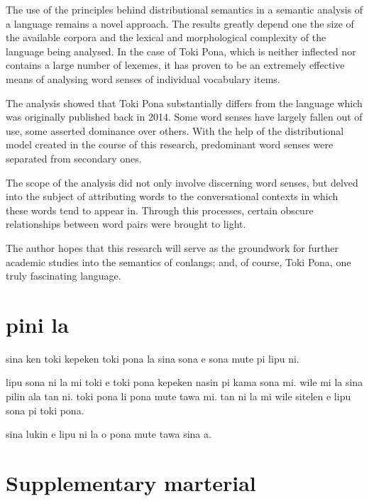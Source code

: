 \documentclass[14pt, a4paper]{extreport}
\begin{document}
The use of the principles behind distributional semantics in a semantic analysis of a language remains a novel approach. The results greatly depend one the size of the available corpora and the lexical and morphological complexity of the language being analysed. In the case of Toki Pona, which is neither inflected nor contains a large number of lexemes, it has proven to be an extremely effective means of analysing word senses of individual vocabulary items.

The analysis showed that Toki Pona substantially differs from the language which was originally published back in 2014. Some word senses have largely fallen out of use, some asserted dominance over others. With the help of the distributional model created in the course of this research, predominant word senses were separated from secondary ones.

The scope of the analysis did not only involve discerning word senses, but delved into the subject of attributing words to the conversational contexts in which these words tend to appear in. Through this processes, certain obscure relationships between word pairs were brought to light.

The author hopes that this research will serve as the groundwork for further academic studies into the semantics of conlangs; and, of course, Toki Pona, one truly fascinating language.
\chapter{pini la}

\newfontfamily{}

\myfont\LARGE

sina ken toki kepeken toki pona la sina sona e sona mute pi lipu ni.

lipu sona ni la mi toki e toki pona kepeken nasin pi kama sona mi. wile mi la sina pilin ala tan ni. toki pona li pona mute tawa mi. tan ni la mi wile sitelen e lipu sona pi toki pona.

sina lukin e lipu ni la o pona mute tawa sina a.

\normalfont

\printbibliography[heading=bibintoc, title={References}, nottype=online]
\printbibliography[heading=bibintoc, title={Online resources}, type=online]

\chapter{Supplementary marterial}
\end{document}
